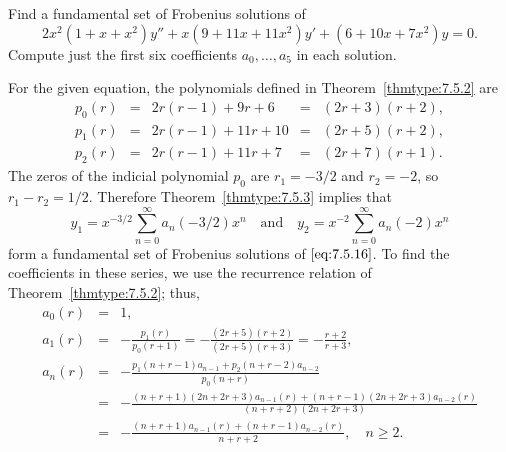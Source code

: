 \documentclass{ximera}
\begin{document}
\begin{example}\label{example:7.5.1}
Find a fundamental set of
Frobenius solutions of
\begin{equation} \label{eq:7.5.16}
2x^2(1+x+x^2)y''+x(9+11x+11x^2)y'+(6+10x+7x^2)y=0.
\end{equation}
Compute just the first six coefficients $a_0,\dots, a_5$ in each
solution.

\begin{explanation}
For  the given equation, the polynomials defined in
Theorem~\ref{thmtype:7.5.2} are
$$
\begin{array}{ccccc}
p_0(r)&=&2r(r-1)+9r+6&=&(2r+3)(r+2),\\
p_1(r)&=&2r(r-1)+11r+10&=&(2r+5)(r+2),\\ 
p_2(r)&=&2r(r-1)+11r+7&=&(2r+7)(r+1).
\end{array}
$$
The zeros of the indicial polynomial $p_0$ are $r_1=-3/2$
and $r_2=-2$, so  $r_1-r_2=1/2$. Therefore
Theorem~\ref{thmtype:7.5.3} implies that
\begin{equation} \label{eq:7.5.17}
y_1=x^{-3/2}\sum_{n=0}^\infty a_n(-3/2)x^n\quad\mbox{and}\quad
y_2=x^{-2}\sum_{n=0}^\infty a_n(-2)x^n
\end{equation}
form a fundamental set of Frobenius solutions of $\eqref{eq:7.5.16}$.
To find the coefficients in these series, we use the recurrence
relation of Theorem~\ref{thmtype:7.5.2};   thus,
\begin{eqnarray*}
a_0(r)&=&1,\\
a_1(r)&=&-\frac{p_1(r)}{p_0(r+1)}
=-\frac{(2r+5)(r+2)}{(2r+5)(r+3)}
=-\frac{r+2}{r+3},\\
a_n(r)&=&-\frac{p_1(n+r-1)a_{n-1}+p_2(n+r-2)a_{n-2}}{p_0(n+r)}\\
&=&-\frac{(n+r+1)(2n+2r+3)a_{n-1}(r)
+(n+r-1)(2n+2r+3)a_{n-2}(r)}{(n+r+2)(2n+2r+3)}\\
&=&-\frac{(n+r+1)a_{n-1}(r)+(n+r-1)a_{n-2}(r)}{n+r+2},\quad n\geq2.
\end{eqnarray*}


\end{explanation}
\end{example}
\end{document}
